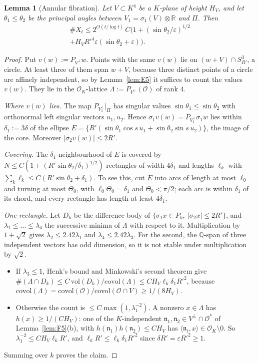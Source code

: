 \documentclass[aps,prx,twocolumn,superscriptaddress,nofootinbib,longbibliography]{revtex4-2}
\theoremstyle{plain}
\newtheorem{lemma}{Lemma}
\theoremstyle{definition}
\theoremstyle{remark}
\newcommand{\Q}{\mathbb{Q}}
\newcommand{\R}{\mathbb{R}}
\begin{document}
\begin{lemma}[Annular fibration]\label{lem:G1}
Let $V\subset K^4$ be a $K$-plane of height $H_V$, and let $\theta_1\le\theta_2$ be the principal angles between
$V_1=\sigma_1(V)\otimes\R$ and $\Pi$. Then
\begin{multline*}
\#X_t\le2^{O(t/\log t)}\,C\big(1+(\sin\theta_2/\varepsilon)^{1/2}\\
+H_VR'^4\varepsilon(\sin\theta_2+\varepsilon)\big).
\end{multline*}
\end{lemma}
\begin{proof}
Put $v(w):=P_{V^\perp}w$. Points with the same $v(w)$ lie on $(w+V)\cap S^3_{R'}$, a circle. At least three of them span $w+V$, because
three distinct points of a circle are affinely independent, so by Lemma~\ref{lem:E5} it suffices to count the values $v(w)$. They lie in the $\mathcal O_K$-lattice
$\Lambda:=P_{V^\perp}(\mathcal O)$ of rank $4$.

\emph{Where $v(w)$ lies.} The map $P_{V_1^\perp}|_\Pi$ has singular values $\sin\theta_1\le\sin\theta_2$ with
orthonormal left singular vectors $u_1,u_2$. Hence $\sigma_1v(w)=P_{V_1^\perp}\sigma_1w$ lies within
$\delta_1:=3\delta$ of the ellipse $E=\{R'(\sin\theta_1\cos s\,u_1+\sin\theta_2\sin s\,u_2)\}$, the image of the
core. Moreover $|\sigma_2v(w)|\le2R'$.

\emph{Covering.} The $\delta_1$-neighbourhood of $E$ is covered by
$N\le C(1+(R'\sin\theta_2/\delta_1)^{1/2})$ rectangles of width $4\delta_1$ and lengths $\ell_k$ with
$\sum_k\ell_k\le C(R'\sin\theta_2+\delta_1)$. To see this, cut $E$ into arcs of length at most
$\ell_0$ and turning at most $\Theta_0$, with $\ell_0\Theta_0=\delta_1$ and $\Theta_0<\pi/2$; each arc is within $\delta_1$
of its chord, and every rectangle has length at least $4\delta_1$.

\emph{One rectangle.} Let $D_k$ be the difference body of $\{\sigma_1x\in P_k,\ |\sigma_2x|\le2R'\}$, and
$\lambda_1\le\dots\le\lambda_4$ the successive minima of $\Lambda$ with respect to it. Multiplication by
$1+\sqrt2$ gives $\lambda_2\le2.42\lambda_1$ and $\lambda_4\le2.42\lambda_3$. For the second, the $\Q$-span of three
independent vectors has odd dimension, so it is not stable under multiplication by $\sqrt2$.
\begin{itemize}\setlength\itemsep{0pt}
\item If $\lambda_3\le1$, Henk's bound and Minkowski's second theorem give
$\#(\Lambda\cap D_k)\le C\,\mathrm{vol}(D_k)/\mathrm{covol}(\Lambda)\le CH_V\ell_k\delta_1R'^2$, because
$\mathrm{covol}(\Lambda)=\mathrm{covol}(\mathcal O)/\mathrm{covol}(\mathcal O\cap V)\ge1/(8H_V)$.
\item Otherwise the count is $\le C\max(1,\lambda_1^{-2})$. A nonzero $x\in\Lambda$ has $h(x)\ge1/(CH_V)$:
one of the $K$-independent $\mathfrak n_1,\mathfrak n_2\in V^\perp\cap\mathcal O^*$ of Lemma~\ref{lem:F5}(b), with $h(\mathfrak n_1)h(\mathfrak n_2)\le CH_V$
has $\langle\mathfrak n_i,x\rangle\in\mathcal O_K\setminus0$. So $\lambda_1^{-2}\le CH_V\ell_kR'$, and
$\ell_kR'\le\ell_k\delta_1R'^2$ since $\delta R'=\varepsilon R'^2\ge1$.
\end{itemize}
Summing over $k$ proves the claim.
\end{proof}
\end{document}
